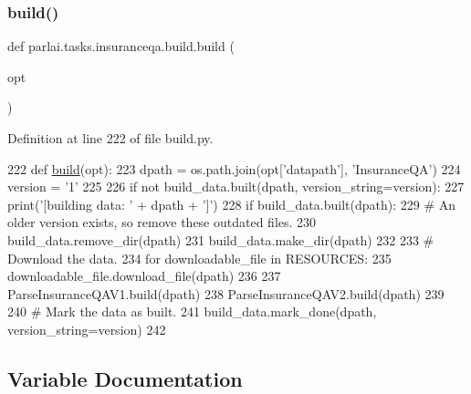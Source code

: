 \subsubsection{\texorpdfstring{build()}{build()}}
{\footnotesize\ttfamily def parlai.\+tasks.\+insuranceqa.\+build.\+build (\begin{DoxyParamCaption}\item[{}]{opt }\end{DoxyParamCaption})}



Definition at line 222 of file build.\+py.


\begin{DoxyCode}
222 \textcolor{keyword}{def }\hyperlink{namespacedialog__babi__feedback_1_1build_a7a9d289f7493a5ded13c4b7f071b6184}{build}(opt):
223     dpath = os.path.join(opt[\textcolor{stringliteral}{'datapath'}], \textcolor{stringliteral}{'InsuranceQA'})
224     version = \textcolor{stringliteral}{'1'}
225 
226     \textcolor{keywordflow}{if} \textcolor{keywordflow}{not} build\_data.built(dpath, version\_string=version):
227         print(\textcolor{stringliteral}{'[building data: '} + dpath + \textcolor{stringliteral}{']'})
228         \textcolor{keywordflow}{if} build\_data.built(dpath):
229             \textcolor{comment}{# An older version exists, so remove these outdated files.}
230             build\_data.remove\_dir(dpath)
231         build\_data.make\_dir(dpath)
232 
233         \textcolor{comment}{# Download the data.}
234         \textcolor{keywordflow}{for} downloadable\_file \textcolor{keywordflow}{in} RESOURCES:
235             downloadable\_file.download\_file(dpath)
236 
237         ParseInsuranceQAV1.build(dpath)
238         ParseInsuranceQAV2.build(dpath)
239 
240         \textcolor{comment}{# Mark the data as built.}
241         build\_data.mark\_done(dpath, version\_string=version)
242 \end{DoxyCode}


\subsection{Variable Documentation}
\mbox{\label{namespaceparlai_1_1tasks_1_1insuranceqa_1_1build_ab0ec3ef6da60bb6f79d7345f2fe18985}} 
